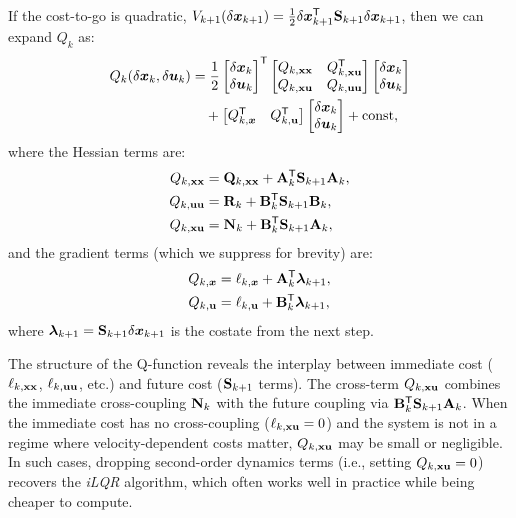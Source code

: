 If the cost-to-go is quadratic, $V_{k+1}(\delta\bm{x}_{k+1}) = \frac{1}{2}\delta\bm{x}_{k+1}^{\mathsf{T}}\mathbf{S}_{k+1}\delta\bm{x}_{k+1}$, then
we can expand $Q_k$ as:
\begin{align}
Q_k(\delta\bm{x}_k,\delta\bm{u}_k) &= \frac{1}{2} \begin{bmatrix} \delta\bm{x}_k \\ \delta\bm{u}_k \end{bmatrix}^{\mathsf{T}}
\begin{bmatrix} Q_{k,\mathbf{x}\mathbf{x}} & Q_{k,\mathbf{x}\mathbf{u}}^{\mathsf{T}} \\ Q_{k,\mathbf{x}\mathbf{u}} & Q_{k,\mathbf{u}\mathbf{u}} \end{bmatrix}
\begin{bmatrix} \delta\bm{x}_k \\ \delta\bm{u}_k \end{bmatrix} \notag \\
&\quad + \begin{bmatrix} Q_{k,\bm{x}}^{\mathsf{T}} & Q_{k,\mathbf{u}}^{\mathsf{T}} \end{bmatrix} \begin{bmatrix} \delta\bm{x}_k \\ \delta\bm{u}_k \end{bmatrix} + \text{const},
\label{eq:ch5:Q-quadratic}
\end{align}
where the Hessian terms are:
\begin{align}
Q_{k,\mathbf{x}\mathbf{x}} &= \mathbf{Q}_{k,\mathbf{x}\mathbf{x}} + \mathbf{A}_k^{\mathsf{T}}\mathbf{S}_{k+1}\mathbf{A}_k, \label{eq:ch5:Qxx}\\
Q_{k,\mathbf{u}\mathbf{u}} &= \mathbf{R}_k + \mathbf{B}_k^{\mathsf{T}}\mathbf{S}_{k+1}\mathbf{B}_k, \label{eq:ch5:Quu}\\
Q_{k,\mathbf{x}\mathbf{u}} &= \mathbf{N}_k + \mathbf{B}_k^{\mathsf{T}}\mathbf{S}_{k+1}\mathbf{A}_k, \label{eq:ch5:Qxu}
\end{align}
and the gradient terms (which we suppress for brevity) are:
\begin{align}
Q_{k,\bm{x}} &= \ell_{k,\bm{x}} + \mathbf{A}_k^{\mathsf{T}}\bm{\lambda}_{k+1}, \label{eq:ch5:Qx}\\
Q_{k,\mathbf{u}} &= \ell_{k,\mathbf{u}} + \mathbf{B}_k^{\mathsf{T}}\bm{\lambda}_{k+1}, \label{eq:ch5:Qu}
\end{align}
where $\bm{\lambda}_{k+1} = \mathbf{S}_{k+1}\delta\bm{x}_{k+1}$ is the costate from the next step.

\begin{intuitionbox}
The structure of the Q-function reveals the interplay between immediate cost ($\ell_{k,\mathbf{x}\mathbf{x}}$, $\ell_{k,\mathbf{u}\mathbf{u}}$, etc.)
and future cost ($\mathbf{S}_{k+1}$ terms). The cross-term $Q_{k,\mathbf{x}\mathbf{u}}$ combines the immediate cross-coupling
$\mathbf{N}_k$ with the future coupling via $\mathbf{B}_k^{\mathsf{T}}\mathbf{S}_{k+1}\mathbf{A}_k$. When the immediate cost has no
cross-coupling ($\ell_{k,\mathbf{x}\mathbf{u}} = 0$) and the system is not in a regime where velocity-dependent costs matter,
$Q_{k,\mathbf{x}\mathbf{u}}$ may be small or negligible. In such cases, dropping second-order dynamics terms (i.e., setting
$Q_{k,\mathbf{x}\mathbf{u}} = 0$) recovers the \emph{iLQR} algorithm, which often works well in practice while being cheaper to
compute.
\end{intuitionbox}

